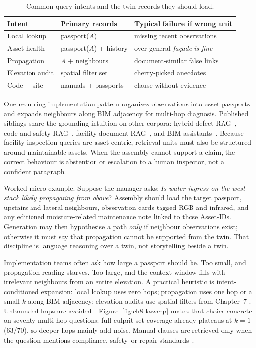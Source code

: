 \begin{table}[htbp]
\centering
\caption{Common query intents and the twin records they should load.}
\label{tab:ch8-intents}
\begin{tabular}{llp{4.8cm}}
\toprule
Intent & Primary records & Typical failure if wrong unit \\
\midrule
Local lookup & passport($A$) & missing recent observations \\
Asset health & passport($A$) + history & over-general \emph{fa\c{c}ade is fine} \\
Propagation & $A$ + neighbours & document-similar false links \\
Elevation audit & spatial filter set & cherry-picked anecdotes \\
Code + site & manuals + passports & clause without evidence \\
\bottomrule
\end{tabular}
\end{table}

One recurring implementation pattern organises observations into asset passports and expands neighbours along BIM adjacency for multi-hop diagnosis. Published siblings share the grounding intuition on other corpora: hybrid defect RAG~\cite{jeon2025hybridrag}, code and safety RAG~\cite{joffe2025buildingcodes,lee2024ragsafety}, facility-document RAG~\cite{krutli2025fmrags}, and BIM assistants~\cite{zheng2023bimassistant}. Because facility inspection queries are asset-centric, retrieval units must also be structured around maintainable assets. When the assembly cannot support a claim, the correct behaviour is abstention or escalation to a human inspector, not a confident paragraph.

Worked micro-example. Suppose the manager asks: \emph{Is water ingress on the west stack likely propagating from above}? Assembly should load the target passport, upstairs and lateral neighbours, observation cards tagged RGB and infrared, and any editioned moisture-related maintenance note linked to those Asset-IDs. Generation may then hypothesise a path \emph{only} if neighbour observations exist; otherwise it must say that propagation cannot be supported from the twin. That discipline is language reasoning over a twin, not storytelling beside a twin.


Implementation teams often ask how large a passport should be. Too small, and propagation reading starves. Too large, and the context window fills with irrelevant neighbours from an entire elevation. A practical heuristic is intent-conditioned expansion: local lookup uses zero hops; propagation uses one hop or a small $k$ along BIM adjacency; elevation audits use spatial filters from Chapter~7 . Unbounded hops are avoided~\cite{peng2024,zhang2025}. Figure~\ref{fig:ch8-ksweep} makes that choice concrete on seventy multi-hop questions: full culprit-set coverage already plateaus at $k=1$ (63/70), so deeper hops mainly add noise. Manual clauses are retrieved only when the question mentions compliance, safety, or repair standards~\cite{joffe2025buildingcodes,lee2024ragsafety}.

